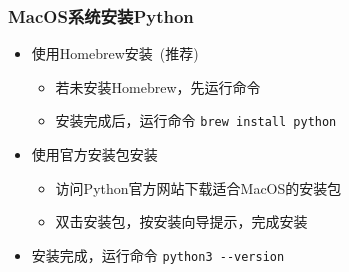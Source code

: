 \begin{frame}[fragile]
	\frametitle{\textrm{MacOS}系统安装\textrm{Python}}
    \begin{itemize}
	    \item 使用\textrm{Homebrew}安装~(推荐)
            \begin{itemize}
		    \item 若未安装\textrm{Homebrew}，先运行命令~\\
			{\fontsize{8.2pt}{4.2pt}\selectfont{\verb|/bin/bash -c "$(curl -fsSL https://raw.githubusercontent.com/Homebrew/install/HEAD/install.sh)"|}}
			    {\fontsize{7.2pt}{4.2pt}}
                \item 安装完成后，运行命令 \verb|brew install python|\\
			{\fontsize{7.2pt}{4.2pt}}
            \end{itemize}
        \item 使用官方安装包安装
            \begin{itemize}
		    \item 访问\textrm{Python}官方网站下载适合\textrm{MacOS}的安装包
                \item 双击安装包，按安装向导提示，完成安装
            \end{itemize}
                \item 安装完成，运行命令 \verb|python3 --version|\\
			{\fontsize{7.2pt}{4.2pt}}
    \end{itemize}
\end{frame}

